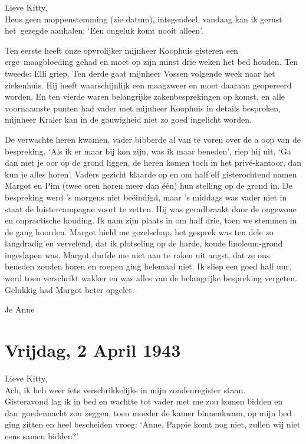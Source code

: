 \documentclass{book}
\begin{document}
Lieve Kitty,\\Heus geen moppenstemming (zie datum), integendeel, vandaag
kan ik gerust het~gezegde aanhalen: `Een ongeluk komt nooit alleen'.

Ten eerste heeft onze opvrolijker mijnheer Koophuis gisteren een
erge~maagbloeding gehad en moet op zijn minst drie weken het bed houden.
Ten tweede: Elli griep. Ten derde gaat mijnheer Vossen volgende week
naar het ziekenhuis. Hij heeft waarschijnlijk een maagzweer en moet
daaraan geopereerd worden. En ten vierde waren belangrijke
zakenbesprekingen op komst, en alle voornaamste punten had vader met
mijnheer Koophuis in details besproken, mijnheer Kraler kan in de
gauwigheid niet zo goed ingelicht worden.

De verwachte heren kwamen, vader bibberde al van te voren over de a oop
van de bespreking. `Als ik er maar bij kon zijn, was ik maar beneden',
riep hij uit. `Ga dan met je oor op de grond liggen, de heren komen toch
in het privé-kantoor, dan kun je alles horen'. Vaders gezicht klaarde op
en om half elf gisterochtend namen Margot en Pim (twee oren horen meer
dan één) hun stelling op de grond in. De bespreking werd 's morgens niet
beëindigd, maar 's middags was vader niet in staat de luistercampagne
voort te zetten. Hij was geradbraakt door de ongewone en onpractische
houding. Ik nam zijn plaats in om half drie, toen we stemmen in de gang
hoorden. Margot hield me gezelschap, het gesprek was ten dele zo
langdradig en vervelend, dat ik plotseling op de harde, koude
linoleum-grond ingeslapen was. Margot durfde me niet aan te raken uit
angst, dat ze ons beneden zouden horen en roepen ging helemaal niet. Ik
sliep een goed half uur, werd toen verschrikt wakker en was alles van de
belangrijke bespreking vergeten. Gelukkig had Margot beter opgelet.

Je Anne

\chapter{Vrijdag, 2 April 1943}

Lieve Kitty,\\Ach, ik heb weer iets verschrikkelijks in mijn
zondenregister staan.\\Gisteravond lag ik in bed en wachtte tot vader
met me zou komen bidden en dan~goedennacht zou zeggen, toen moeder de
kamer binnenkwam, op mijn bed ging zitten en heel bescheiden vroeg:
`Anne, Pappie komt nog niet, zullen wij niet eens samen bidden?'
\end{document}
